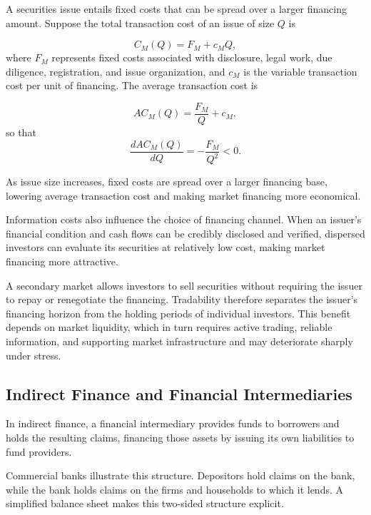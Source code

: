 A securities issue entails fixed costs that can be spread over a larger financing amount. Suppose the total transaction cost of an issue of size $Q$ is

\begin{equation}
C_M(Q)=F_M+c_MQ,
\label{eq:ch4-market-financing-cost}
\end{equation}
where $F_M$ represents fixed costs associated with disclosure, legal work, due diligence, registration, and issue organization, and $c_M$ is the variable transaction cost per unit of financing. The average transaction cost is

\begin{equation}
AC_M(Q)=\frac{F_M}{Q}+c_M,
\label{eq:ch4-market-average-cost}
\end{equation}
so that
\begin{equation}
\frac{dAC_M(Q)}{dQ}
=-\frac{F_M}{Q^2}
<0.
\label{eq:ch4-market-scale-effect}
\end{equation}

As issue size increases, fixed costs are spread over a larger financing base, lowering average transaction cost and making market financing more economical.

Information costs also influence the choice of financing channel. When an issuer's financial condition and cash flows can be credibly disclosed and verified, dispersed investors can evaluate its securities at relatively low cost, making market financing more attractive.  

A secondary market allows investors to sell securities without requiring the issuer to repay or renegotiate the financing. Tradability therefore separates the issuer's financing horizon from the holding periods of individual investors. This benefit depends on market liquidity, which in turn requires active trading, reliable information, and supporting market infrastructure and may deteriorate sharply under stress.

\subsection{Indirect Finance and Financial Intermediaries}

In indirect finance, a financial intermediary provides funds to borrowers and holds the resulting claims, financing those assets by issuing its own liabilities to fund providers.

Commercial banks illustrate this structure. Depositors hold claims on the bank, while the bank holds claims on the firms and households to which it lends. A simplified balance sheet makes this two-sided structure explicit.
 

